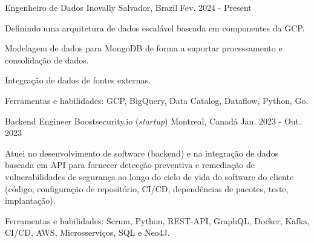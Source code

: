 


\begin{cventries}


\cventry
{Engenheiro de Dados} %
{Inovally} %
{Salvador, Brazil} %
{Fev. 2024 - Present} %
{ %
\begin{cvitems}
	\item{Definindo uma arquitetura de dados escalável baseada em componentes da GCP.}
	\item{Modelagem de dados para MongoDB de forma a suportar processamento e consolidação de dados.}
	\item{Integração de dados de fontes externas.}
	\item{Ferramentas e habilidades: GCP, BigQuery, Data Catalog, Dataflow, Python, Go.}
\end{cvitems}
}

\cventry
{Backend Engineer} %
{Boostsecurity.io (\textit{startup})} %
{Montreal, Canadá} %
{Jan. 2023 - Out. 2023} %
{ %
\begin{cvitems}
	\item {Atuei no desenvolvimento de software (backend) e na integração de dados baseada em API para fornecer detecção preventiva e remediação de vulnerabilidades de segurança ao longo do ciclo de vida do software do cliente (código, configuração de repositório, CI/CD, dependências de pacotes, teste, implantação).}
	\item{Ferramentas e habilidades: Scrum, Python, REST-API, GraphQL, Docker, Kafka, CI/CD, AWS, Microsserviços, SQL e Neo4J.}
\end{cvitems}
}



\end{cventries}
